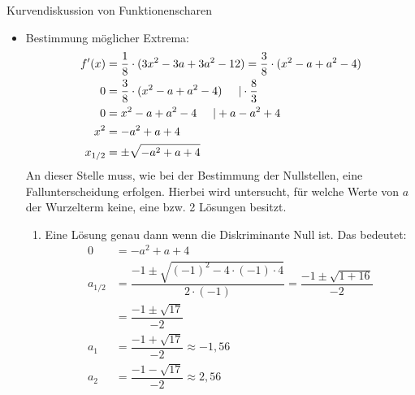 \begin{bsp}{Kurvendiskussion von Funktionenscharen}{}
\begin{itemize}
\begin{enumerate}
Daraus folgt, dass $G_{f_a}$ genau eine Nullstelle\footnote{Mit der Vielfachheit 3.} bei $x=0 $ hat, wenn der Parameter $a$ den Werte $a_1 = \dfrac{-1 +\sqrt{17}}{-2}$ bzw. $a_2=\dfrac{-1 -\sqrt{17}}{-2}$ annimmt.
\item Zwei Lösungen genau dann wenn der Parameter folgende Ungleichung erfüllt: $a_1 < a <a_2$. Daraus folgt, dass der $G_{f_a}$ genau drei Nullstellen besitzt.
\item Keine Lösung genau dann wenn folgende Beziehungen erfüllt sind $a< a_1$ und $a>a_2$. Das führt dazu, dass der Graph $G_{f_a}$ genau eine Nullstelle\footnote{Mit der Vielfachheit 1} bei $x= 0$ hat.
\end{enumerate}
\item Bestimmung möglicher Extrema:
    \begin{equation*}
    \begin{split}
        f'(x) &= \dfrac{1}{8} \cdot (3x^2 -3a +3a^2 -12) = \dfrac{3}{8}\cdot (x^2-a+a^2-4)\\
        0 &= \dfrac{3}{8}\cdot (x^2-a+a^2-4) \hspace{0.5cm} |\cdot \dfrac{8}{3}\\
        0&= x^2-a+a^2-4 \hspace{0.5cm} | +a -a^2+4\\
        x^2&= -a^2+a+4\\ 
        x_{1/2} &= \pm \sqrt{-a^2+a+4}
        \end{split}
\end{equation*}
An dieser Stelle muss, wie bei der Bestimmung der Nullstellen, eine Fallunterscheidung erfolgen. Hierbei wird untersucht, für welche Werte von $a$ der Wurzelterm keine, eine bzw. 2 Lösungen besitzt.
\begin{enumerate}
    \item Eine Lösung genau dann wenn die Diskriminante Null ist. Das bedeutet:
        \begin{equation*}
    \begin{split}
        0 &= -a^2 +a +4\\
        a_{1/2} &= \dfrac{-1 \pm \sqrt{(-1)^2 - 4\cdot (-1) \cdot 4}}{2\cdot (-1)} = \dfrac{-1\pm \sqrt{1+16}}{-2}\\
        &= \dfrac{-1\pm \sqrt{17}}{-2}\\
        a_1&= \dfrac{-1 +\sqrt{17}}{-2}\approx -1,56\\
       a_2&= \dfrac{-1 -\sqrt{17}}{-2} \approx 2,56      
       \end{split}
\end{equation*}

\end{enumerate}
\end{itemize}
\end{bsp}
